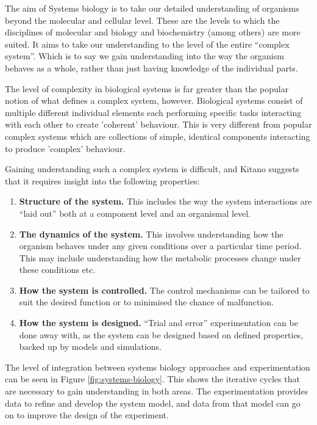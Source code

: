 The aim of Systems biology is to take our detailed understanding of organisms beyond the molecular and cellular level. These are the levels to which the disciplines of molecular and biology and biochemistry (among others) are more suited. It aims to take our understanding to the level of the entire ``complex system''. Which is to say we gain understanding into the way the organism behaves as a whole, rather than just having knowledge of the individual parts.

The level of complexity in biological systems is far greater than the popular notion of what defines a complex system, however. Biological systems consist of multiple different individual elements each performing specific tasks interacting with each other to create 'coherent' behaviour. This is very different from popular complex systems which are collections of simple, identical components interacting to produce 'complex' behaviour\cite{Kitano2002}.

Gaining understanding such a complex system is difficult, and Kitano suggests that it requires insight into the following properties\cite{Kitano2002a}:
\begin{enumerate}
 \item {\bf Structure of the system.} This includes the way the system interactions are ``laid out'' both at a component level and an organismal level.
 \item {\bf The dynamics of the system.} This involves understanding how the organism behaves under any given conditions over a particular time period. This may include understanding how the metabolic processes change under these conditions etc.
 \item {\bf How the system is controlled.} The control mechanisms can be tailored to suit the desired function or to minimised the chance of malfunction.
 \item {\bf How the system is designed.} ``Trial and error'' experimentation can be done away with, as the system can be designed based on defined properties, backed up by models and simulations.  
\end{enumerate}

The level of integration between systems biology approaches and experimentation can be seen in Figure \ref{fig:systems-biology}. This shows the iterative cycles that are necessary to gain understanding in both areas. The experimentation provides data to refine and develop the system model, and data from that model can go on to improve the design of the experiment.

